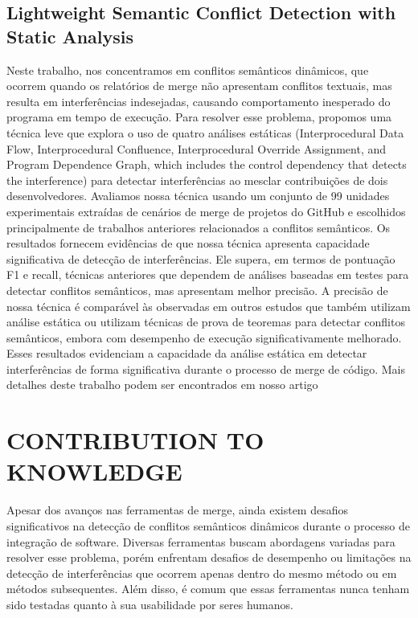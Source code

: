 \documentclass[sigconf,review]{acmart}
\begin{document}
\subsection{Lightweight Semantic Conflict Detection with Static Analysis}
Neste trabalho, nos concentramos em conflitos semânticos dinâmicos, que ocorrem quando os relatórios de merge não apresentam conflitos textuais, mas resulta em interferências indesejadas, causando comportamento inesperado do programa em tempo de execução.
Para resolver esse problema, propomos uma técnica leve que explora o uso de quatro análises estáticas (Interprocedural Data Flow, Interprocedural
Confluence, Interprocedural Override Assignment, and Program Dependence Graph, which includes the control
dependency that detects the interference) para detectar interferências ao mesclar contribuições de dois desenvolvedores.
Avaliamos nossa técnica usando um conjunto de 99 unidades experimentais extraídas de cenários de merge de projetos do GitHub e escolhidos principalmente de trabalhos anteriores relacionados a conflitos semânticos. 
Os resultados fornecem evidências de que nossa técnica apresenta capacidade significativa de detecção de interferências. Ele supera, em termos de pontuação F1 e recall, técnicas anteriores que dependem de análises baseadas em testes para detectar conflitos semânticos, mas apresentam melhor precisão.
A precisão de nossa técnica é comparável às observadas em outros estudos que também utilizam análise estática ou utilizam técnicas de prova de teoremas para detectar conflitos semânticos, embora com desempenho de execução significativamente melhorado. Esses resultados evidenciam a capacidade da análise estática em detectar interferências de forma significativa durante o processo de merge de código. Mais detalhes deste trabalho podem ser encontrados em nosso artigo \cite{galileu}

\section{CONTRIBUTION TO KNOWLEDGE}

Apesar dos avanços nas ferramentas de merge, ainda existem desafios significativos na detecção de conflitos semânticos dinâmicos durante o processo de integração de software. Diversas ferramentas buscam abordagens variadas para resolver esse problema, porém enfrentam desafios de desempenho ou limitações na detecção de interferências que ocorrem apenas dentro do mesmo método ou em métodos subsequentes. Além disso, é comum que essas ferramentas nunca tenham sido testadas quanto à sua usabilidade por seres humanos.
\end{document}
